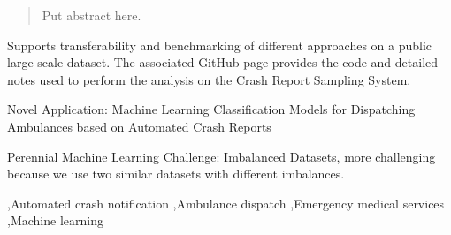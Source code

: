 \documentclass[fleqn]{cas-sc}
\begin{document}






\begin{abstract}
Put abstract here.
\vskip 1in

\end{abstract}


\begin{highlights}
	\item  Supports transferability and benchmarking of different approaches on a public large-scale dataset.  The associated GitHub page provides the code and detailed notes used to perform the analysis on the Crash Report Sampling System.  
	\item Novel Application:  Machine Learning Classification Models for Dispatching Ambulances based on Automated Crash Reports
	\item Perennial Machine Learning Challenge:  Imbalanced Datasets, more challenging because we use two similar datasets with different imbalances.
	\item 
\end{highlights}

\begin{keywords}
 \sep Automated crash notification \sep Ambulance dispatch \sep Emergency medical services  \sep Machine learning
\end{keywords}
\end{document}
